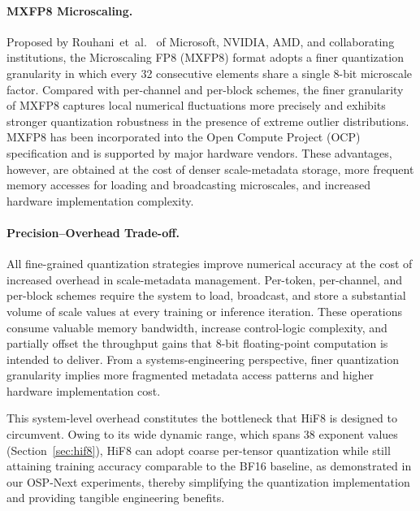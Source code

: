 \paragraph{MXFP8 Microscaling.}
Proposed by Rouhani~et~al.~\cite{rouhani2023microscaling} of Microsoft, NVIDIA, AMD,
and collaborating institutions, the Microscaling FP8 (MXFP8) format adopts a finer
quantization granularity in which every 32 consecutive elements share a single 8-bit
microscale factor.
Compared with per-channel and per-block schemes, the finer granularity of MXFP8
captures local numerical fluctuations more precisely and exhibits stronger
quantization robustness in the presence of extreme outlier distributions.
MXFP8 has been incorporated into the Open Compute Project (OCP) specification and is
supported by major hardware vendors.
These advantages, however, are obtained at the cost of denser scale-metadata storage,
more frequent memory accesses for loading and broadcasting microscales, and increased
hardware implementation complexity.

\paragraph{Precision--Overhead Trade-off.}
All fine-grained quantization strategies improve numerical accuracy at the cost of
increased overhead in scale-metadata management.
Per-token, per-channel, and per-block schemes require the system to load, broadcast,
and store a substantial volume of scale values at every training or inference
iteration.
These operations consume valuable memory bandwidth, increase control-logic complexity,
and partially offset the throughput gains that 8-bit floating-point computation is
intended to deliver.
From a systems-engineering perspective, finer quantization granularity implies more
fragmented metadata access patterns and higher hardware implementation cost.

This system-level overhead constitutes the bottleneck that HiF8 is designed to
circumvent.
Owing to its wide dynamic range, which spans 38 exponent values
(Section~\ref{sec:hif8}), HiF8 can adopt coarse per-tensor quantization while still
attaining training accuracy comparable to the BF16 baseline, as demonstrated in our
OSP-Next experiments, thereby simplifying the quantization implementation and
providing tangible engineering benefits.
